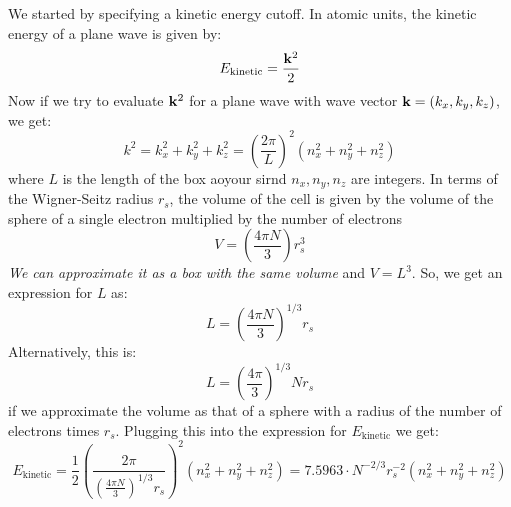 \documentclass[12pt]{article}
\begin{document}
We started by specifying a kinetic energy cutoff. In atomic units, the kinetic energy of a plane wave is given by:
\begin{equation}
    E_{\text{kinetic}} = \frac{\vb{k}^2}{2}
\end{equation}
Now if we try to evaluate $\vb{k}^2$ for a plane wave with wave vector $\vb{k} = (k_x, k_y, k_z)$, we get:
\begin{equation}
    k^2 = k_x^2 + k_y^2 + k_z^2 =  \left(\frac{2\pi}{L}\right)^2 \left(n_x^2 + n_y^2 + n_z^2\right)
\end{equation}
where \( L \) is the length of the box aoyour sirnd \( n_x, n_y, n_z \) are integers. In terms of the Wigner-Seitz radius \( r_s \), the volume of the cell is given by the volume of the sphere of a single electron multiplied by the number of electrons
\begin{equation}
    V = \left(\frac{4\pi N}{3}\right) r_s^3
\end{equation}
\emph{We can approximate it as a box with the same volume} and \( V= L^3 \). So, we get an expression for \( L \) as:
\begin{equation}
    L = \left( \frac{4\pi N}{3} \right)^{1/3} r_s
\end{equation}
Alternatively, this is:
\begin{equation}
    L = \left( \frac{4\pi }{3} \right)^{1/3} N r_s
\end{equation}
if we approximate the volume as that of a sphere with a radius of the number of electrons times \( r_s \).
Plugging this into the expression for $E_{\text{kinetic}}$ we get:
\begin{equation}
    E_{\text{kinetic}} = \frac{1}{2}\left(\frac{2 \pi}{\left( \frac{4\pi N}{3} \right)^{1/3} r_s}\right)^2 \left(n_x^2 + n_y^2 + n_z^2\right) = 7.5963 \cdot N^{-2/3} r_s^{-2} \left(n_x^2 + n_y^2 + n_z^2\right)
\end{equation}
\end{document}

